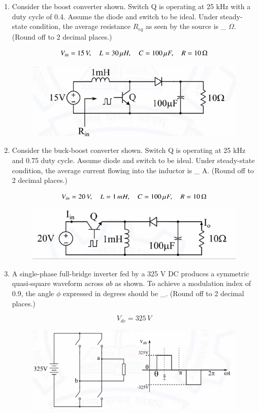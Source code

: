 \documentclass[journal,12pt,onecolumn]{IEEEtran}
\theoremstyle{remark}
\begin{document}
\begin{flushleft}
\begin{enumerate}
\item Consider the boost converter shown. Switch Q is operating at 25 kHz with a duty cycle of 0.4. Assume the diode and switch to be ideal. Under steady-state condition, the average resistance $R_{eq}$ as seen by the source is \_ $\Omega$. (Round off to 2 decimal places.)

\[
V_{in} = 15 \, V, \quad L = 30 \,\mu H, \quad C = 100 \,\mu F, \quad R = 10 \,\ohm
\]


\begin{figure}[H]
    \centering
    \includegraphics[width=0.5\columnwidth]{figs/63.png}
    \caption{}
    \label{fig:placeholder}
\end{figure}


\item Consider the buck-boost converter shown. Switch Q is operating at 25 kHz and 0.75 duty cycle. Assume diode and switch to be ideal. Under steady-state condition, the average current flowing into the inductor is \_ A. (Round off to 2 decimal places.)

\[
V_{in} = 20 \, V, \quad L = 1 \, mH, \quad C = 100 \,\mu F, \quad R = 10 \,\ohm
\]


\begin{figure}[H]
    \centering
    \includegraphics[width=0.5\columnwidth]{figs/64.png}
    \caption{}
    \label{fig:placeholder}
\end{figure}


\item A single-phase full-bridge inverter fed by a 325 V DC produces a symmetric quasi-square waveform across $ab$ as shown. To achieve a modulation index of 0.9, the angle $\phi$ expressed in degrees should be \_. (Round off to 2 decimal places.)

\[
V_{dc} = 325 \, V
\]


\textbf{}
\begin{figure}[H]
    \centering
    \includegraphics[width=0.5\columnwidth]{figs/65.png}
    \caption{}
    \label{fig:placeholder}
\end{figure}
\end{enumerate}



\end{flushleft}
\end{document}
